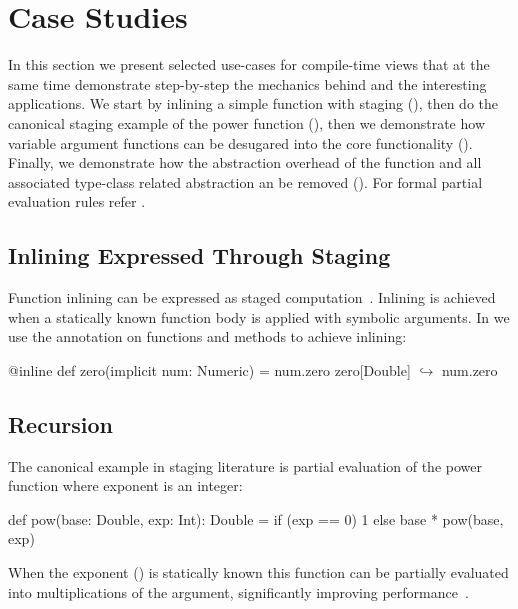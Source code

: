 \section{Case Studies}
\label{sct:case-studies}

In this section we present selected use-cases for compile-time views that at the
same  time demonstrate step-by-step the mechanics behind \tool and the
interesting applications.  We start by inlining a simple function with staging
(), then do the canonical staging  example of the power function
(), then we demonstrate how variable argument functions can
be  desugared into the core functionality (). Finally, we
demonstrate how the abstraction overhead of the  function and all
associated type-class related abstraction an be removed ().
For formal partial evaluation rules refer \cf {}.

\subsection{Inlining Expressed Through Staging}
\label{sct:inlining}

Function inlining can be expressed as staged computation~\cite{monnier2003inlining}.
 Inlining is achieved when a statically known function body is applied with symbolic
 arguments. In \tool we use the  annotation on functions and methods to achieve inlining:\begin{lstparagraph}
@inline def zero(implicit num: Numeric) = num.zero
zero[Double]
  $\hookrightarrow$ num.zero
\end{lstparagraph}


\subsection{Recursion}
\label{sct:recursion}

The canonical example in staging literature is partial evaluation of the power function
 where exponent is an integer:
\begin{lstparagraph}
def pow(base: Double, exp: Int): Double =
  if (exp == 0) 1 else base * pow(base, exp)
\end{lstparagraph} When the exponent () is statically known this function can be partially
evaluated into  multiplications of the  argument, significantly
improving performance~\cite{calcagno2003implementing}.

